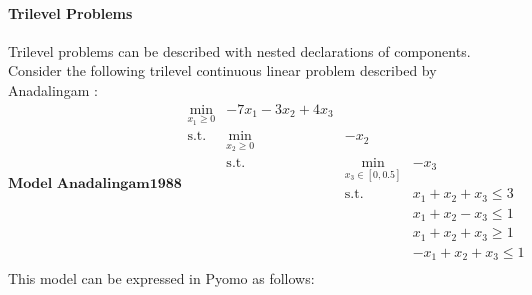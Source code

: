 \documentclass[letterpaper,10pt,english]{sphinxmanual}
\begin{document}
\paragraph{Trilevel Problems}
\label{\detokenize{representations/pyomo:trilevel-problems}}
Trilevel problems can be described with nested declarations of
{\hyperref[\detokenize{reference/pyomo:pao.pyomo.components.SubModel}]{}} components.  Consider the following trilevel continuous
linear problem described by Anadalingam :
\label{equation:sand:eq-anadalingam} \begin{equation*}
 \textbf{Model Anadalingam1988}
 \begin{array}{llll}
 \min_{x_1 \geq 0} & -7 x_1 - 3 x_2 + 4 x_3 \\
 \textrm{s.t.} & \min_{x_2 \geq 0} & -x_2 \\
               & \textrm{s.t.} & \min_{x_3 \in [0,0.5]} & -x_3 \\
               &               & \textrm{s.t.} & x_1 + x_2 + x_3 \leq 3\\
               &               &               & x_1 + x_2 - x_3 \leq 1\\
               &               &               & x_1 + x_2 + x_3 \geq 1\\
               &               &               & -x_1 + x_2 + x_3 \leq 1\\
 \end{array}
 \end{equation*}
This model can be expressed in Pyomo as follows:
\end{document}
